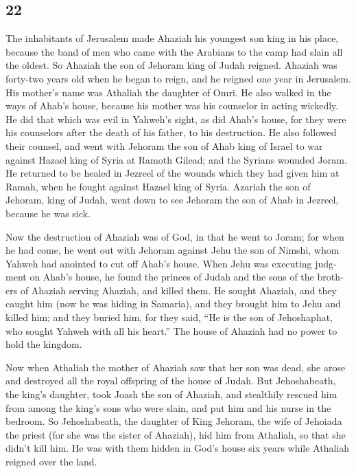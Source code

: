 \begin{paracol}{2}
\switchcolumn
\begin{otherlanguage}{english}

\hypertarget{section-43}{%
\section{22}\label{section-43}}

 The inhabitants of Jerusalem made Ahaziah his youngest
son king in his place, because the band of men who came with the
Arabians to the camp had slain all the oldest. So Ahaziah the son of
Jehoram king of Judah reigned.  Ahaziah was forty-two
years old when he began to reign, and he reigned one year in Jerusalem.
His mother's name was Athaliah the daughter of Omri.  He
also walked in the ways of Ahab's house, because his mother was his
counselor in acting wickedly.  He did that which was evil
in Yahweh's sight, as did Ahab's house, for they were his counselors
after the death of his father, to his destruction.  He
also followed their counsel, and went with Jehoram the son of Ahab king
of Israel to war against Hazael king of Syria at Ramoth Gilead; and the
Syrians wounded Joram.  He returned to be healed in
Jezreel of the wounds which they had given him at Ramah, when he fought
against Hazael king of Syria. Azariah the son of Jehoram, king of Judah,
went down to see Jehoram the son of Ahab in Jezreel, because he was
sick.

 Now the destruction of Ahaziah was of God, in that he
went to Joram; for when he had come, he went out with Jehoram against
Jehu the son of Nimshi, whom Yahweh had anointed to cut off Ahab's
house.  When Jehu was executing judgment on Ahab's house,
he found the princes of Judah and the sons of the brothers of Ahaziah
serving Ahaziah, and killed them.  He sought Ahaziah, and
they caught him (now he was hiding in Samaria), and they brought him to
Jehu and killed him; and they buried him, for they said, ``He is the son
of Jehoshaphat, who sought Yahweh with all his heart.'' The house of
Ahaziah had no power to hold the kingdom.

 Now when Athaliah the mother of Ahaziah saw that her son
was dead, she arose and destroyed all the royal offspring of the house
of Judah.  But Jehoshabeath, the king's daughter, took
Joash the son of Ahaziah, and stealthily rescued him from among the
king's sons who were slain, and put him and his nurse in the bedroom. So
Jehoshabeath, the daughter of King Jehoram, the wife of Jehoiada the
priest (for she was the sister of Ahaziah), hid him from Athaliah, so
that she didn't kill him.  He was with them hidden in
God's house six years while Athaliah reigned over the land.


\end{otherlanguage}
\end{paracol}
